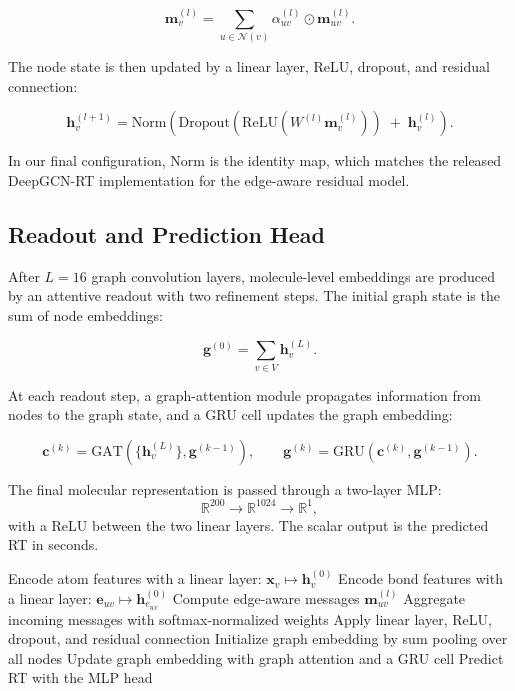 \begin{equation}
\mathbf{m}^{(l)}_v =
\sum\limits_{u \in \mathcal{N}(v)}
\alpha^{(l)}_{uv} \odot \mathbf{m}^{(l)}_{uv} .
\end{equation}

The node state is then updated by a linear layer, ReLU, dropout, and residual connection:

\begin{equation}
\mathbf{h}^{(l+1)}_v =
\mathrm{Norm}
\left(
\mathrm{Dropout}
\left(
\mathrm{ReLU}
\left(
W^{(l)} \mathbf{m}^{(l)}_v
\right)
\right)
\;+\;
\mathbf{h}^{(l)}_v
\right).
\end{equation}

In our final configuration, \(\mathrm{Norm}\) is the identity map, which matches the released DeepGCN-RT implementation for the edge-aware residual model.

\subsection{Readout and Prediction Head}

After \(L=16\) graph convolution layers, molecule-level embeddings are produced by an attentive readout with two refinement steps. The initial graph state is the sum of node embeddings:

\begin{equation}
\mathbf{g}^{(0)} = \sum_{v \in V} \mathbf{h}^{(L)}_v .
\end{equation}

At each readout step, a graph-attention module propagates information from nodes to the graph state, and a GRU cell updates the graph embedding:

\begin{equation}
\mathbf{c}^{(k)} = \mathrm{GAT}\!\left(\{\mathbf{h}^{(L)}_v\}, \mathbf{g}^{(k-1)}\right),
\qquad
\mathbf{g}^{(k)} = \mathrm{GRU}\!\left(\mathbf{c}^{(k)}, \mathbf{g}^{(k-1)}\right).
\end{equation}

The final molecular representation is passed through a two-layer MLP:
\[
\mathbb{R}^{200} \rightarrow \mathbb{R}^{1024} \rightarrow \mathbb{R}^{1},
\]
with a ReLU between the two linear layers. The scalar output is the predicted RT in seconds.

\begin{algorithm}[t]
\caption{Forward Pass of Our DeepGCN-RT Reimplementation}
\begin{algorithmic}[1]
\State Encode atom features with a linear layer: \(\mathbf{x}_v \mapsto \mathbf{h}^{(0)}_v\)
\State Encode bond features with a linear layer: \(\mathbf{e}_{uv} \mapsto \mathbf{h}^{(0)}_{e_{uv}}\)
    \State Compute edge-aware messages \(\mathbf{m}^{(l)}_{uv}\)
    \State Aggregate incoming messages with softmax-normalized weights
    \State Apply linear layer, ReLU, dropout, and residual connection
\EndFor
\State Initialize graph embedding by sum pooling over all nodes
    \State Update graph embedding with graph attention and a GRU cell
\EndFor
\State Predict RT with the MLP head
\end{algorithmic}
\end{algorithm}

